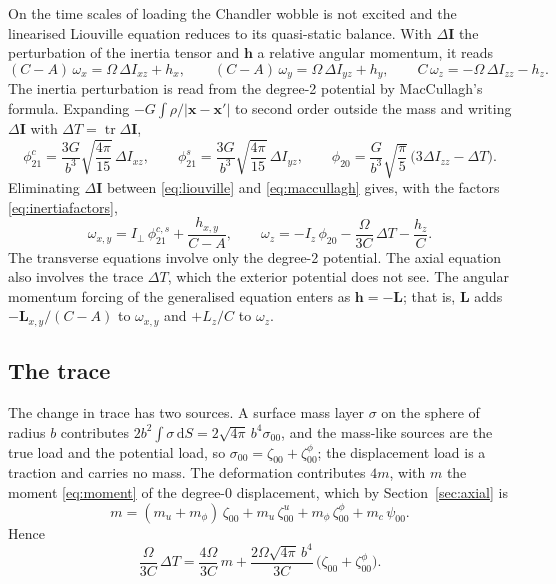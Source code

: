 \documentclass[11pt,a4paper]{article}
\newcommand{\dd}{\mathrm{d}}
\newcommand{\x}{\mathbf{x}}
\numberwithin{equation}{section}
\begin{document}
On the time scales of loading the Chandler wobble is not excited and the
linearised Liouville equation reduces to its quasi-static balance. With
$\Delta\mathbf{I}$ the perturbation of the inertia tensor and $\mathbf{h}$ a
relative angular momentum, it reads
\begin{equation}
(C-A)\,\omega_{x} = \Omega\,\Delta I_{xz} + h_{x},\qquad
(C-A)\,\omega_{y} = \Omega\,\Delta I_{yz} + h_{y},\qquad
C\,\omega_{z} = -\Omega\,\Delta I_{zz} - h_{z}.
\label{eq:liouville}
\end{equation}
The inertia perturbation is read from the degree-2 potential by MacCullagh's
formula. Expanding $-G\int\rho/|\x-\x'|$ to second order outside the mass and
writing $\Delta\mathbf{I}$ with $\Delta T=\operatorname{tr}\Delta\mathbf{I}$,
\begin{equation}
\phi^{c}_{21} = \frac{3G}{b^{3}}\sqrt{\frac{4\pi}{15}}\,\Delta I_{xz},\qquad
\phi^{s}_{21} = \frac{3G}{b^{3}}\sqrt{\frac{4\pi}{15}}\,\Delta I_{yz},\qquad
\phi_{20} = \frac{G}{b^{3}}\sqrt{\frac{\pi}{5}}\,\big(3\Delta I_{zz}-\Delta T\big).
\label{eq:maccullagh}
\end{equation}
Eliminating $\Delta\mathbf{I}$ between \eqref{eq:liouville} and
\eqref{eq:maccullagh} gives, with the factors \eqref{eq:inertiafactors},
\begin{equation}
\omega_{x,y} = I_{\perp}\,\phi^{c,s}_{21} + \frac{h_{x,y}}{C-A},\qquad
\omega_{z} = -I_{z}\,\phi_{20} - \frac{\Omega}{3C}\,\Delta T - \frac{h_{z}}{C}.
\label{eq:omega}
\end{equation}
The transverse equations involve only the degree-2 potential. The axial
equation also involves the trace $\Delta T$, which the exterior potential does
not see. The angular momentum forcing of the generalised equation enters as
$\mathbf{h}=-\mathbf{L}$; that is, $\mathbf{L}$ adds
$-\mathbf{L}_{x,y}/(C-A)$ to $\omega_{x,y}$ and $+L_{z}/C$ to $\omega_{z}$.

\subsection{The trace}

The change in trace has two sources. A surface mass layer $\sigma$ on the
sphere of radius $b$ contributes $2b^{2}\int\sigma\,\dd S = 2\sqrt{4\pi}\,b^{4}\sigma_{00}$,
and the mass-like sources are the true load and the potential load, so
$\sigma_{00}=\zeta_{00}+\zeta^{\phi}_{00}$; the displacement load is a traction
and carries no mass. The deformation contributes $4m$, with $m$ the moment
\eqref{eq:moment} of the degree-0 displacement, which by
Section~\ref{sec:axial} is
\begin{equation}
m = (m_{u}+m_{\phi})\,\zeta_{00} + m_{u}\,\zeta^{u}_{00} + m_{\phi}\,\zeta^{\phi}_{00} + m_{c}\,\psi_{00}.
\end{equation}
Hence
\begin{equation}
\frac{\Omega}{3C}\,\Delta T
= \frac{4\Omega}{3C}\,m + \frac{2\Omega\sqrt{4\pi}\,b^{4}}{3C}\,\big(\zeta_{00}+\zeta^{\phi}_{00}\big).
\end{equation}
\end{document}
